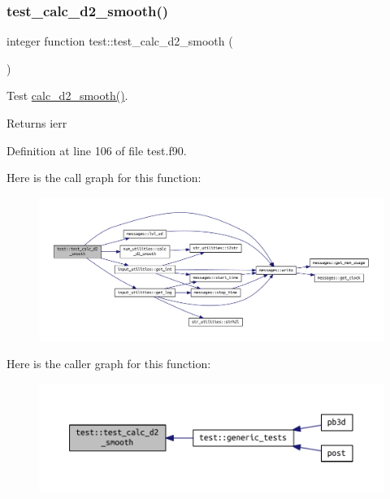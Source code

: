 \subsubsection{\texorpdfstring{test\+\_\+calc\+\_\+d2\+\_\+smooth()}{test\_calc\_d2\_smooth()}}
{\footnotesize\ttfamily integer function test\+::test\+\_\+calc\+\_\+d2\+\_\+smooth (\begin{DoxyParamCaption}{ }\end{DoxyParamCaption})}



Test \hyperlink{namespacenum__utilities_ab4c91a6478c4dd6f519f8ccbccc4094f}{calc\+\_\+d2\+\_\+smooth()}. 

\begin{DoxyReturn}{Returns}
ierr 
\end{DoxyReturn}


Definition at line 106 of file test.\+f90.

Here is the call graph for this function\+:\nopagebreak
\begin{figure}[H]
\begin{center}
\leavevmode
\includegraphics[width=350pt]{namespacetest_a1c04fcea513c8c2efb189049d810318a_cgraph}
\end{center}
\end{figure}
Here is the caller graph for this function\+:\nopagebreak
\begin{figure}[H]
\begin{center}
\leavevmode
\includegraphics[width=350pt]{namespacetest_a1c04fcea513c8c2efb189049d810318a_icgraph}
\end{center}
\end{figure}
\mbox{\label{namespacetest_a0d4cb791bf762b2e52260fea7644a3ee}} 
